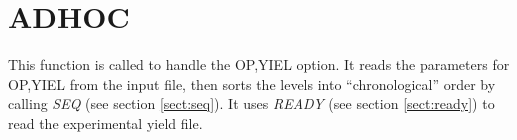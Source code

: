 \section{ADHOC}
\label{sect:adhoc}

\noindent This function is called to handle the OP,YIEL option. It reads the
parameters for OP,YIEL from the input file, then sorts the levels into
``chronological'' order by calling {\em SEQ} (see section \ref{sect:seq}).
It uses {\em READY} (see section \ref{sect:ready}) to read the experimental
yield file.\\
